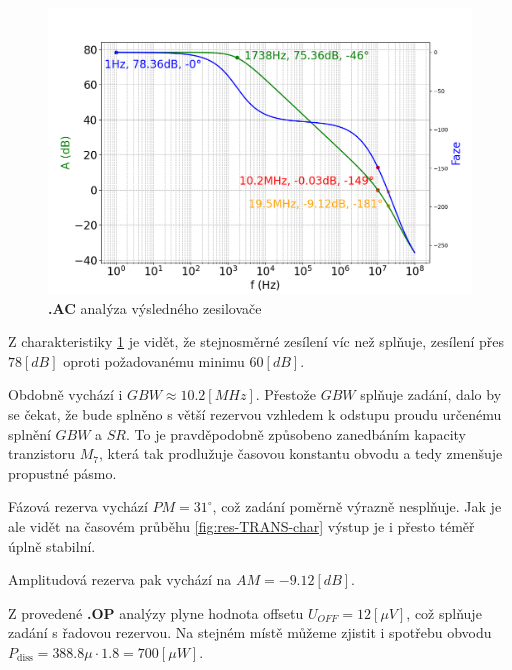 \begin{figure}[h!]
    \centering
    \includegraphics[width=\textwidth]{text/img/AC-charakteristika.png}
    \caption{\label{fig:res-AC-char} {\bf .AC} analýza výsledného zesilovače}
\end{figure}

Z charakteristiky \ref{fig:res-AC-char} je vidět, že stejnosměrné zesílení víc než splňuje, zesílení přes \(78 [dB]\) oproti požadovanému minimu \(60 [dB]\).

Obdobně vychází i \(GBW \approx 10.2 [MHz]\).
Přestože \(GBW\) splňuje zadání, dalo by se čekat, že bude splněno s větší rezervou vzhledem k odstupu proudu určenému splnění \(GBW\) a \(SR\).
To je pravděpodobně způsobeno zanedbáním kapacity tranzistoru \(M_7\), která tak prodlužuje časovou konstantu obvodu a tedy zmenšuje propustné pásmo.

Fázová rezerva vychází \(PM = 31^\circ\), což zadání poměrně výrazně nesplňuje.
Jak je ale vidět na časovém průběhu \ref{fig:res-TRANS-char} výstup je i přesto téměř úplně stabilní.

Amplitudová rezerva pak vychází na \(AM = -9.12 [dB]\).

Z provedené {\bf .OP} analýzy plyne hodnota offsetu \( U_{OFF} = 12 [\mu V]\), což splňuje zadání s řadovou rezervou.
Na stejném místě můžeme zjistit i spotřebu obvodu \(P_{\mathrm{diss}} = 388.8\mu \cdot 1.8 = 700 [\mu W]\).


